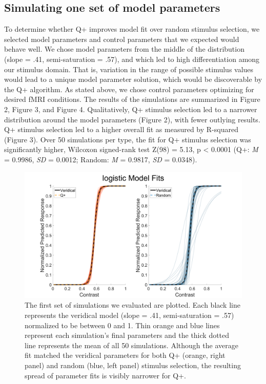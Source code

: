 \documentclass[
  english,
  man,floatsintext]{apa6}
\begin{document}
\hypertarget{simulating-one-set-of-model-parameters}{%
\subsection{Simulating one set of model parameters}\label{simulating-one-set-of-model-parameters}}

To determine whether Q+ improves model fit over random stimulus selection, we selected model parameters and control parameters that we expected would behave well. We chose model parameters from the middle of the distribution (slope = .41, semi-saturation = .57), and which led to high differentiation among our stimulus domain. That is, variation in the range of possible stimulus values would lead to a unique model parameter solution, which would be discoverable by the Q+ algorithm. As stated above, we chose control parameters optimizing for desired fMRI conditions. The results of the simulations are summarized in Figure 2, Figure 3, and Figure 4. Qualitatively, Q+ stimulus selection led to a narrower distribution around the model parameters (Figure 2), with fewer outlying results. Q+ stimulus selection led to a higher overall fit as measured by R-squared (Figure 3). Over 50 simulations per type, the fit for Q+ stimulus selection was significantly higher, Wilcoxon signed-rank test Z(98) = 5.13, p \textless{} 0.0001 (Q+: \emph{M} = 0.9986, \emph{SD} = 0.0012; Random: \emph{M} = 0.9817, \emph{SD} = 0.0348).

\newpage

\begin{figure}
  
  {\centering \includegraphics[width=500px]{../results/figs/fig1_7Outcomes_15Noise_12trialLength_800TR} 
  
  }
  
  \caption{The first set of simulations we evaluated are plotted. Each black line represents the veridical model (slope = .41, semi-saturation = .57) normalized to be between 0 and 1. Thin orange and blue lines represent each simulation's final parameters and the thick dotted line represents the mean of all 50 simulations. Although the average fit matched the veridical parameters for both Q+ (orange, right panel) and random (blue, left panel) stimulus selection, the resulting spread of parameter fits is visibly narrower for Q+.
\newpage}\label{fig:results-figure-firstsims-1}
  \end{figure}
\end{document}
